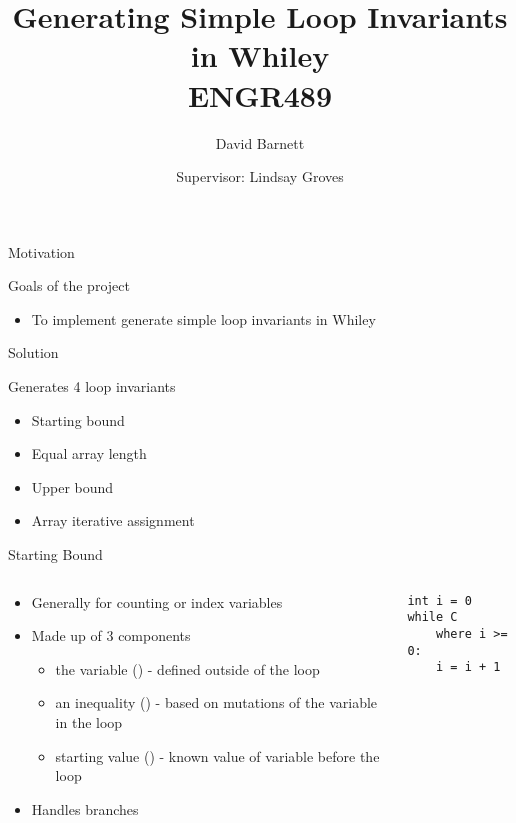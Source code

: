 

\title{Generating Simple Loop Invariants in Whiley \\ ENGR489}
\author{David Barnett}
\date{Supervisor: Lindsay Groves}


\frame{\titlepage}


\begin{frame}{Motivation}

Goals of the project
\begin{itemize}
\item{To implement generate simple loop invariants in Whiley}
\end{itemize}

\end{frame}



\begin{frame}{Solution}

Generates 4 loop invariants

\begin{itemize}
\item Starting bound
\item Equal array length
\item Upper bound
\item Array iterative assignment
\end{itemize}

\end{frame}

\begin{frame}[fragile]{Starting Bound}

\begin{columns}

\begin{column}{0.5\textwidth}
\begin{itemize}
\item Generally for counting or index variables
\item Made up of 3 components
\begin{itemize}
    \item the variable () - defined outside of the loop
    \item an inequality (\code{>=}) - based on mutations of the variable in the loop
    \item starting value () - known value of variable before the loop
\end{itemize}

\item Handles branches

\end{itemize}
\end{column}

\begin{column}{0.5\textwidth}
\begin{verbatim}
int i = 0
while C
    where i >= 0:
    i = i + 1
\end{verbatim}
\end{column}

\end{columns}

\end{frame}


